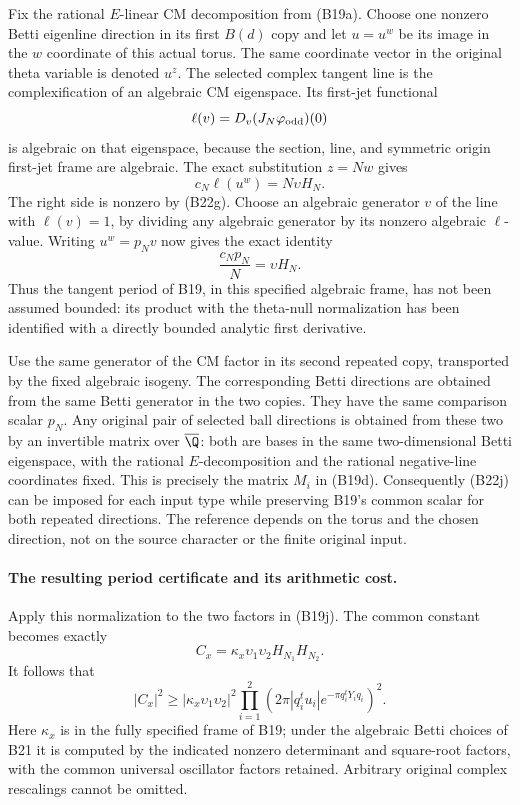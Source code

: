 Fix the rational $E$-linear CM decomposition from (B19a).
Choose one nonzero Betti eigenline direction in its first
$B(d)$ copy and let $u=u^w$ be its image in the $w$
coordinate of this actual torus.  The same coordinate vector
in the original theta variable is denoted $u^z$.
The selected complex tangent line is the complexification of
an algebraic CM eigenspace.  Its first-jet functional
\[
       \ell(v)=D_v(J_N\varphi_{\rm odd})(0)
\]
is algebraic on that eigenspace, because the section, line,
and symmetric origin first-jet frame are algebraic.
The exact substitution $z=Nw$ gives
\[
                          c_N\ell(u^w)=N\upsilon H_N.
 \tag{B22i}
\]
The right side is nonzero by (B22g).  Choose an algebraic
generator $v$ of the line with $\ell(v)=1$, by dividing any
algebraic generator by its nonzero algebraic $\ell$-value.
Writing $u^w=p_Nv$ now gives the exact identity
\[
                    \frac{c_Np_N}{N}=\upsilon H_N.
 \tag{B22j}
\]
Thus the tangent period of B19, in this specified algebraic
frame, has not been assumed bounded: its product with the
theta-null normalization has been identified with a directly
bounded analytic first derivative.

Use the same generator of the CM factor in its second
repeated copy, transported by the fixed algebraic isogeny.
The corresponding Betti directions are obtained from the
same Betti generator in the two copies.  They have the same
comparison scalar $p_N$.  Any original pair of selected
ball directions is obtained from these two by an invertible
matrix over $\overline\Q$: both are bases in the same
two-dimensional Betti eigenspace, with the rational
$E$-decomposition and the rational negative-line coordinates
fixed.  This is precisely the matrix $M_i$ in (B19d).
Consequently (B22j) can be imposed for each input type while
preserving B19's common scalar for both repeated directions.
The reference depends on the torus and the chosen direction,
not on the source character or the finite original input.

\paragraph{The resulting period certificate and its arithmetic cost.}
Apply this normalization to the two factors in (B19j).
The common constant becomes exactly
\[
                  C_x=\kappa_x\upsilon_1\upsilon_2
                                      H_{N_1}H_{N_2}.
\]
It follows that
\[
 |C_x|^2\geq
   |\kappa_x\upsilon_1\upsilon_2|^2
       \prod_{i=1}^2
        \left(2\pi|q_i^tu_i|
                      e^{-\pi q_i^tY_iq_i}\right)^2.
 \tag{B22k}
\]
Here $\kappa_x$ is in the fully specified frame of B19;
under the algebraic Betti choices of B21 it is computed by
the indicated nonzero determinant and square-root factors,
with the common universal oscillator factors retained.
Arbitrary original complex rescalings cannot be omitted.

